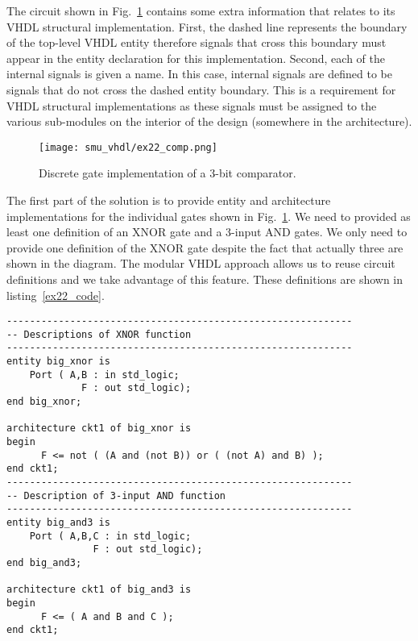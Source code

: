 The circuit shown in Fig.~\ref{ex22_comp} contains some extra information that relates to its VHDL structural implementation. First, the dashed line represents the boundary of the top-level VHDL entity therefore signals that cross this boundary must appear in the entity declaration for this implementation. Second, each of the internal signals is given a name. In this case, internal signals are defined to be signals that do not cross the dashed entity boundary. This is a requirement for VHDL structural implementations as these signals must be assigned to the various sub-modules on the interior of the design (somewhere in the architecture). 

\begin{figure}[!h]
    \centering
	\texttt{[image: smu\_vhdl/ex22\_comp.png]}
	\caption{Discrete gate implementation of a 3-bit comparator.}
	\label{ex22_comp}
\end{figure}

The first part of the solution is to provide entity and architecture implementations for the individual gates shown in Fig.~\ref{ex22_comp}. We need to provided as least one definition of an XNOR gate and a 3-input AND gates. We only need to provide one definition of the XNOR gate despite the fact that actually three are shown in the diagram. The modular VHDL approach allows us to reuse circuit definitions and we take advantage of this feature. These definitions are shown in listing~\ref{ex22_code}. 

\begin{lstlisting}[label=ex22_code, caption=Entity and Architecture definitions for discrete gates.]
------------------------------------------------------------
-- Descriptions of XNOR function
------------------------------------------------------------
entity big_xnor is
    Port ( A,B : in std_logic;
             F : out std_logic);
end big_xnor;

architecture ckt1 of big_xnor is
begin
      F <= not ( (A and (not B)) or ( (not A) and B) ); 
end ckt1;   
------------------------------------------------------------
-- Description of 3-input AND function
------------------------------------------------------------
entity big_and3 is
    Port ( A,B,C : in std_logic;
               F : out std_logic);
end big_and3;

architecture ckt1 of big_and3 is
begin
      F <= ( A and B and C ); 
end ckt1;
\end{lstlisting}

